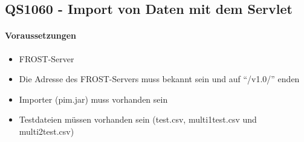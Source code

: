 \newpage

\subsection{QS1060 - Import von Daten mit dem Servlet}
\paragraph{Voraussetzungen}
\begin{itemize}
\item FROST-Server
\item Die Adresse des FROST-Servers muss bekannt sein und auf ``/v1.0/'' enden
\item Importer (pim.jar) muss vorhanden sein
\item Testdateien müssen vorhanden sein (test.csv, multi1test.csv und multi2test.csv)
\end{itemize}
